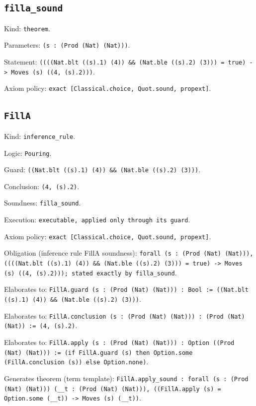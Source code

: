 \documentclass[11pt]{article}
\begin{document}
\subsection*{\texttt{filla\_sound}}
\noindent Kind: \texttt{theorem}.\par
\noindent Parameters: \texttt{(s : (Prod (Nat) (Nat)))}.\par
\noindent Statement: \texttt{((((Nat.blt ((s).1) (4)) \&\& (Nat.ble ((s).2) (3))) = true) -> Moves (s) ((4, (s).2)))}.\par
\noindent Axiom policy: \texttt{exact [Classical.choice, Quot.sound, propext]}.\par
\subsection*{\texttt{FillA}}
\noindent Kind: \texttt{inference_rule}.\par
\noindent Logic: \texttt{Pouring}.\par
\noindent Guard: \texttt{((Nat.blt ((s).1) (4)) \&\& (Nat.ble ((s).2) (3)))}.\par
\noindent Conclusion: \texttt{(4, (s).2)}.\par
\noindent Soundness: \texttt{filla\_sound}.\par
\noindent Execution: \texttt{executable, applied only through its guard}.\par
\noindent Axiom policy: \texttt{exact [Classical.choice, Quot.sound, propext]}.\par
\noindent Obligation (inference rule FillA soundness): \texttt{forall (s : (Prod (Nat) (Nat))), ((((Nat.blt ((s).1) (4)) \&\& (Nat.ble ((s).2) (3))) = true) -> Moves (s) ((4, (s).2))); stated exactly by filla\_sound}.\par
\noindent Elaborates to: \texttt{FillA.guard (s : (Prod (Nat) (Nat))) : Bool := ((Nat.blt ((s).1) (4)) \&\& (Nat.ble ((s).2) (3)))}.\par
\noindent Elaborates to: \texttt{FillA.conclusion (s : (Prod (Nat) (Nat))) : (Prod (Nat) (Nat)) := (4, (s).2)}.\par
\noindent Elaborates to: \texttt{FillA.apply (s : (Prod (Nat) (Nat))) : Option ((Prod (Nat) (Nat))) := (if FillA.guard (s) then Option.some (FillA.conclusion (s)) else Option.none)}.\par
\noindent Generates theorem (term template): \texttt{FillA.apply\_sound : forall (s : (Prod (Nat) (Nat))) (\_\_t : (Prod (Nat) (Nat))), ((FillA.apply (s) = Option.some (\_\_t)) -> Moves (s) (\_\_t))}.\par
\end{document}
